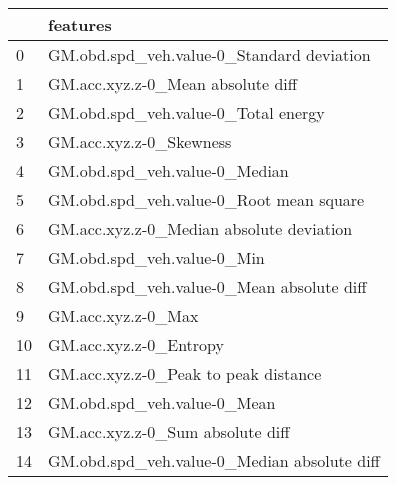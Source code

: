 \begin{tabular}{ll}
\toprule
{} &                                     features \\
\midrule
0  &    GM.obd.spd\_veh.value-0\_Standard deviation \\
1  &            GM.acc.xyz.z-0\_Mean absolute diff \\
2  &          GM.obd.spd\_veh.value-0\_Total energy \\
3  &                      GM.acc.xyz.z-0\_Skewness \\
4  &                GM.obd.spd\_veh.value-0\_Median \\
5  &      GM.obd.spd\_veh.value-0\_Root mean square \\
6  &     GM.acc.xyz.z-0\_Median absolute deviation \\
7  &                   GM.obd.spd\_veh.value-0\_Min \\
8  &    GM.obd.spd\_veh.value-0\_Mean absolute diff \\
9  &                           GM.acc.xyz.z-0\_Max \\
10 &                       GM.acc.xyz.z-0\_Entropy \\
11 &         GM.acc.xyz.z-0\_Peak to peak distance \\
12 &                  GM.obd.spd\_veh.value-0\_Mean \\
13 &             GM.acc.xyz.z-0\_Sum absolute diff \\
14 &  GM.obd.spd\_veh.value-0\_Median absolute diff \\
\bottomrule
\end{tabular}
